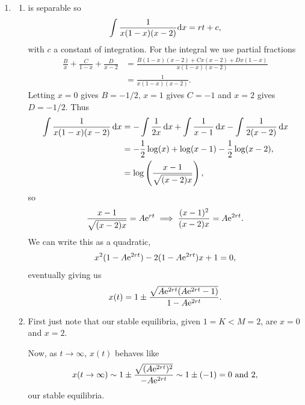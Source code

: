 \documentclass[a4paper, 12pt]{article}
\begin{document}
\begin{enumerate}[label={\bf \arabic{*}.\;}, ref={\arabic{*}},itemsep=3ex, left=0ex]
{\begin{enumerate}[label=(\alph*)]
        \item
          \begin{enumerate}
            \item
               is separable so
              \begin{equation}
                \int \frac{1}{x(1-x)(x-2)}{\mathrm d} x = rt + c,
              \end{equation}
              with $c$ a constant of integration. For the integral we use partial fractions
              \begin{align}
                \frac{B}{x} + \frac{C}{1-x} + \frac{D}{x-2} &=  \frac{B(1-x)(x-2) + Cx(x-2) + Dx(1-x)}{x(1-x)(x-2)} \\ &= \frac{1}{x(1-x)(x-2)}.
              \end{align}
              Letting $x=0$ gives $B = -1/2$, $x=1$ gives $C=-1$ and $x=2$ gives $D=-1/2$. Thus
              \begin{align}
                \int \frac{1}{x(1-x)(x-2)}\,{\mathrm d} x  &= -\int\frac{1}{2x}\,{\mathrm d} x +\int\frac{1}{x-1}\,{\mathrm d} x - \int\frac{1}{2(x-2)}\,{\mathrm d} x \\
                & = -\frac{1}{2}\log(x) + \log(x-1)-\frac{1}{2}\log(x-2),\\
                & = \log\left(\frac{x-1}{\sqrt{(x-2)x}}\right),
              \end{align}
              so
              \begin{equation}
                \frac{x-1}{\sqrt{(x-2)x}} = A\mathrm{e}^{rt} \implies \frac{(x-1)^2}{(x-2)x} = A\mathrm{e}^{2rt}.
              \end{equation}
              We can write this as a quadratic,
              \begin{equation}
                x^2(1-A\mathrm{e} ^{2rt}) -2(1-A\mathrm{e} ^{2rt})x + 1 =0,
              \end{equation}
              eventually giving us
              \begin{equation}
                x(t) = 1 \pm \frac{\sqrt{A\mathrm{e} ^{2rt}(A\mathrm{e} ^{2rt}-1)}}{1-A\mathrm{e} ^{2rt}}.
              \end{equation}

            \item First just note that our stable equilibria, given $1 = K < M=2$, are $x=0$ and $x=2$.

              Now, as $t\to\infty$, $x(t)$ behaves like
              \begin{equation}
                x(t\to\infty) \sim 1 \pm \frac{\sqrt{(A\mathrm{e}^{2rt})^2}}{-A\mathrm{e}^{2rt}} \sim 1 \pm (-1) = 0\text{ and }2,
              \end{equation}
              our stable equilibria.


\end{enumerate}
\end{enumerate}}
\end{enumerate}
\end{document}
